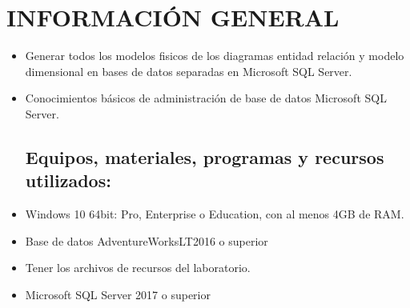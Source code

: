 \section{INFORMACIÓN GENERAL} 

\begin{itemize}
\subsection{Objetivos:}
	\item Generar todos los modelos fisicos de los diagramas entidad relación y modelo dimensional en bases de datos separadas en Microsoft SQL Server.
	\item Conocimientos básicos de administración de base de datos Microsoft SQL Server.
\subsection{Equipos, materiales, programas y recursos utilizados:}
	\item Windows 10 64bit: Pro, Enterprise o Education, con al menos 4GB de RAM.
	\item Base de datos AdventureWorksLT2016 o superior
	\item Tener los archivos de recursos del laboratorio.
	\item Microsoft SQL Server 2017 o superior

\end{itemize}
